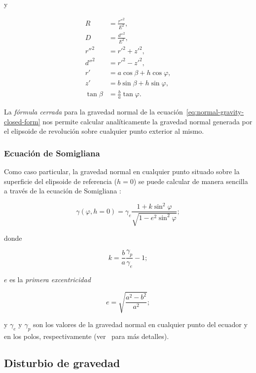 \noindent y

\begin{align}
    R &= \frac{{r''}^2}{E^2}, \\
    D &= \frac{{d''}^2}{E^2}, \\
    {r''}^2 &= {r'}^2 + {z'}^2, \\
    {d''}^2 &= {r'}^2 - {z'}^2, \\
    r' &= a\cos\beta + h\cos\varphi, \\
    z' &= b\sin\beta + h\sin\varphi, \\
    \tan\beta &= \frac{b}{a}\tan\varphi.
\end{align}

La \emph{fórmula cerrada} para la gravedad normal de la
ecuación~\ref{eq:normal-gravity-closed-form} nos permite calcular
analíticamente la gravedad normal generada por el elipsoide de revolución sobre
cualquier punto exterior al mismo.

\subsubsection{Ecuación de Somigliana}

Como caso particular, la gravedad normal en cualquier punto situado sobre la
superficie del elipsoide de referencia ($h=0$) se puede calcular de manera
sencilla a través de la ecuación de Somigliana \citep{heiskanen1967}:

\begin{equation}
    \gamma(\varphi, h=0) =
        \gamma_e
        \frac{1 + k \sin^2\varphi}{\sqrt{1 - e^2 \sin^2\varphi}};
    \label{eq:somigliana}
\end{equation}

\noindent donde

\begin{equation}
    k = \frac{b}{a} \frac{\gamma_p}{\gamma_e} - 1;
\end{equation}

\noindent $e$ es la \emph{primera excentricidad}

\begin{equation}
    e = \sqrt{\frac{a^2 - b^2}{a^2}};
\end{equation}

\noindent y $\gamma_e$ y $\gamma_p$ son los valores de la gravedad normal en
cualquier punto del ecuador y en los polos, respectivamente
(ver~\citet[][p.~68--69]{heiskanen1967} para más detalles).


\subsection{Disturbio de gravedad}

